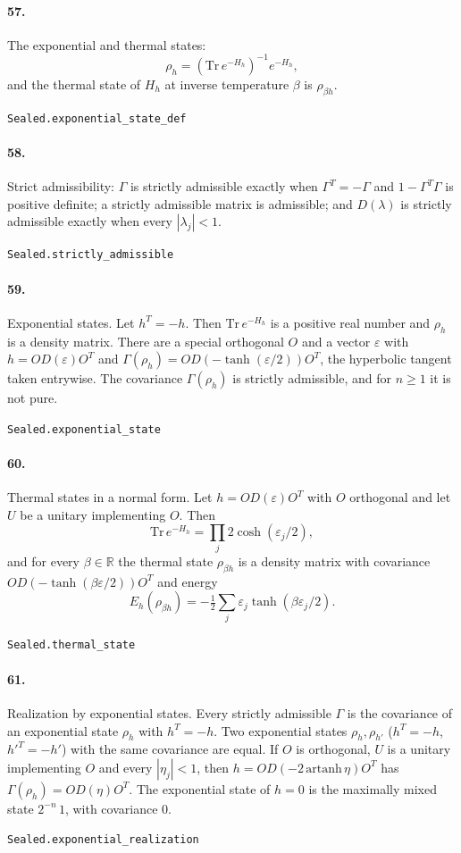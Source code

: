 \documentclass[11pt]{article}
\begin{document}
\paragraph{57.} The exponential and thermal states: \[\rho_h = (\mathrm{Tr}\,e^{-H_h})^{-1} e^{-H_h},\] and the thermal state of $H_h$ at inverse temperature $\beta$ is $\rho_{\beta h}$.\par{\footnotesize\texttt{Sealed.exponential\_state\_def}}

\paragraph{58.} Strict admissibility: $\Gamma$ is strictly admissible exactly when $\Gamma^T = -\Gamma$ and $1 - \Gamma^T\Gamma$ is positive definite; a strictly admissible matrix is admissible; and $D(\lambda)$ is strictly admissible exactly when every $|\lambda_j| < 1$.\par{\footnotesize\texttt{Sealed.strictly\_admissible}}

\paragraph{59.} Exponential states. Let $h^T = -h$. Then $\mathrm{Tr}\,e^{-H_h}$ is a positive real number and $\rho_h$ is a density matrix. There are a special orthogonal $O$ and a vector $\varepsilon$ with $h = O D(\varepsilon) O^T$ and $\Gamma(\rho_h) = O D(-\tanh(\varepsilon/2)) O^T$, the hyperbolic tangent taken entrywise. The covariance $\Gamma(\rho_h)$ is strictly admissible, and for $n \ge 1$ it is not pure.\par{\footnotesize\texttt{Sealed.exponential\_state}}

\paragraph{60.} Thermal states in a normal form. Let $h = O D(\varepsilon) O^T$ with $O$ orthogonal and let $U$ be a unitary implementing $O$. Then \[\mathrm{Tr}\,e^{-H_h} = \prod_j 2\cosh(\varepsilon_j/2),\] and for every $\beta \in \mathbb R$ the thermal state $\rho_{\beta h}$ is a density matrix with covariance $O D(-\tanh(\beta\varepsilon/2)) O^T$ and energy \[E_h(\rho_{\beta h}) = -\tfrac12\sum_j \varepsilon_j \tanh(\beta\varepsilon_j/2).\]\par{\footnotesize\texttt{Sealed.thermal\_state}}

\paragraph{61.} Realization by exponential states. Every strictly admissible $\Gamma$ is the covariance of an exponential state $\rho_h$ with $h^T = -h$. Two exponential states $\rho_h, \rho_{h'}$ ($h^T = -h$, $h'^T = -h'$) with the same covariance are equal. If $O$ is orthogonal, $U$ is a unitary implementing $O$ and every $|\eta_j| < 1$, then $h = O D(-2\,\mathrm{artanh}\,\eta) O^T$ has $\Gamma(\rho_h) = O D(\eta) O^T$. The exponential state of $h = 0$ is the maximally mixed state $2^{-n}\,1$, with covariance $0$.\par{\footnotesize\texttt{Sealed.exponential\_realization}}
\end{document}
